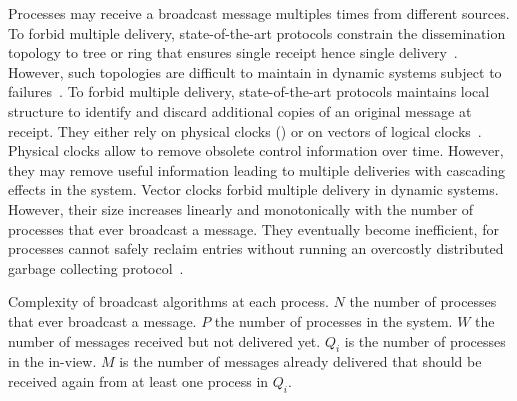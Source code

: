 Processes may receive a broadcast message multiples times from different
sources.  To forbid multiple delivery, state-of-the-art protocols constrain the
dissemination topology to tree or ring that ensures single receipt hence single
delivery~\cite{bravo2017saturn,raynal2013distributed}. However, such topologies
are difficult to maintain in dynamic systems subject to
failures~\cite{krasikova2016hashtable}. To forbid multiple delivery,
state-of-the-art protocols maintains local structure to identify and discard
additional copies of an original message at receipt. They either rely on
physical clocks (\REF) or on vectors of logical
clocks~\cite{malkhi2007concise,mukund2014optimized}. Physical clocks allow to
remove obsolete control information over time. However, they may remove useful
information leading to multiple deliveries with cascading effects in the
system. Vector clocks forbid multiple delivery in dynamic systems. However,
their size increases linearly and monotonically with the number of processes
that ever broadcast a message. They eventually become inefficient, for processes
cannot safely reclaim entries without running an overcostly distributed garbage
collecting protocol~\cite{abdullahi1998garbage}.




\begin{table}
  \begin{center}
    \caption{\label{table:complexity} Complexity of broadcast algorithms at each
      process. $N$ the number of processes that ever broadcast a message. $P$
      the number of processes in the system. $W$ the number of messages received
      but not delivered yet. $Q_i$ is the number of processes in the in-view. $M$
      is the number of messages already delivered that should be received again
      from at least one process in $Q_i$.}
    
  \end{center}
\end{table}

